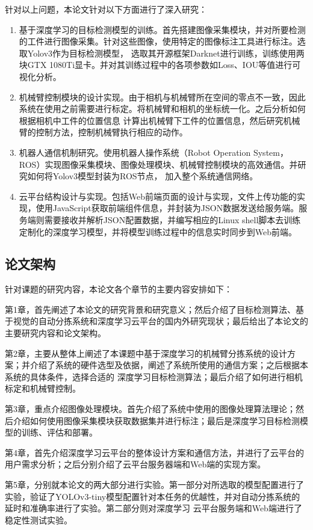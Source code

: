针对以上问题，本论文针对以下方面进行了深入研究：
\begin{enumerate}
    \item{基于深度学习的目标检测模型的训练。首先搭建图像采集模块，并对所要检测的工件进行图像采集。针对这些图像，使用特定的图像标注工具进行标注。选取Yolov3作为目标检测模型，
    选取其开源框架Darknet进行训练，训练使用两块GTX 1080Ti显卡。并对其训练过程中的各项参数如Loss、IOU等值进行可视化分析。}
    \item{机械臂控制模块的设计实现。由于相机与机械臂所在空间的零点不一致，因此系统在使用之前需要进行标定。将机械臂和相机的坐标统一化。之后分析如何根据相机中工件的位置信息
    计算出机械臂下工件的位置信息，然后研究机械臂的控制方法，控制机械臂执行相应的动作。}
    \item{机器人通信机制研究。使用机器人操作系统（Robot Operation System，ROS）实现图像采集模块、图像处理模块、机械臂控制模块的高效通信。并研究如何将Yolov3模型封装为ROS节点，
    加入整个系统通信网络。}
    \item{云平台结构设计与实现。包括Web前端页面的设计与实现，文件上传功能的实现，使用JavaScript获取前端组件信息，并封装为JSON数据发送给服务端。服务端则需要接收并解析JSON配置数据，并编写相应的Linux
     shell脚本去训练定制化的深度学习模型，并将模型训练过程中的信息实时同步到Web前端。}
\end{enumerate}

\subsection{论文架构}
针对课题的研究内容，本论文各个章节的主要内容安排如下：

第1章，首先阐述了本论文的研究背景和研究意义；然后介绍了目标检测算法、基于视觉的自动分拣系统和深度学习云平台的国内外研究现状；最后给出了本论文的主要研究内容和论文架构。

第2章，主要从整体上阐述了本课题中基于深度学习的机械臂分拣系统的设计方案；并介绍了系统的硬件选型及依据，阐述了系统所使用的通信方案；之后根据本系统的具体条件，选择合适的
深度学习目标检测算法；最后介绍了如何进行相机标定和机械臂控制。

第3章，重点介绍图像处理模块。首先介绍了系统中使用的图像处理算法理论；然后介绍如何使用图像采集模块获取数据集并进行标注；最后是深度学习目标检测模型的训练、评估和部署。

第4章，首先介绍深度学习云平台的整体设计方案和通信方法，并进行了云平台的用户需求分析；之后分别介绍了云平台服务器端和Web端的实现方案。

第5章，分别就本论文的两大部分进行实验。第一部分对所选取的模型配置进行了实验，验证了YOLOv3-tiny模型配置针对本任务的优越性，并对自动分拣系统的延时和准确率进行了实验。第二部分则对深度学习
云平台服务端和Web端进行了稳定性测试实验。

